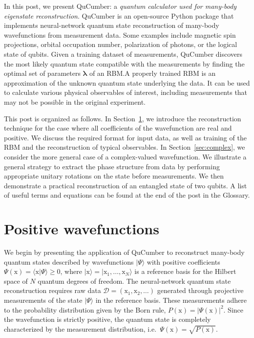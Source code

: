 \documentclass[submission, Phys, hidelnks]{SciPost}
\newcommand{\x}{\bm{\mathrm{x}}}
\begin{document}
In this post, we present QuCumber: a \textit{quantum calculator used for
many-body eigenstate reconstruction}. QuCumber is an open-source Python
package that implements neural-network quantum state reconstruction of
many-body wavefunctions from measurement data.
Some examples include magnetic spin projections, orbital occupation number,
polarization of photons, or the logical state of qubits.
Given a training dataset of measurements, QuCumber discovers the most likely
quantum state compatible with the measurements by finding the optimal set of
parameters $\bm{\lambda}$ of an RBM.\@ A properly trained RBM is an
approximation of the unknown quantum state underlying the data.
It can be used to calculate various physical observables of interest, including
measurements that may not be possible in the original experiment.

This post is organized as follows.
In Section~\ref{sec:positive}, we introduce the reconstruction technique for
the case where all coefficients of the wavefunction are real and positive.
We discuss the required format for input data, as well as training of the RBM
and the reconstruction of typical observables. In Section~\ref{sec:complex},
we consider the more general case of a complex-valued wavefunction.
We illustrate a general strategy to extract the phase structure from data by
performing appropriate unitary rotations on the state before measurements.
We then demonstrate a practical reconstruction of an entangled state of two
qubits. A list of useful terms and equations can be found at the end of the
post in the Glossary.

\section{Positive wavefunctions}\label{sec:positive}
We begin by presenting the application of QuCumber to reconstruct many-body
quantum states described by wavefunctions $|\Psi\rangle$ with positive
coefficients $\Psi(\x)=\langle\x|\Psi\rangle \ge 0$,
where $|\x\rangle=|\mathrm{x}_1,\dots,\mathrm{x}_N\rangle$ is a reference basis
for the Hilbert space of $N$ quantum degrees of freedom.
The neural-network quantum state reconstruction requires raw data
$\mathcal{D}=(\x_1,\x_2,\dots)$ generated through projective measurements of
the state $|\Psi\rangle$ in the reference basis.
These measurements adhere to the probability distribution given by the Born
rule, $P(\x)=|\Psi(\x)|^2$. Since the wavefunction is strictly positive, the
quantum state is completely characterized by the measurement distribution,
i.e.~$\Psi(\x)=\sqrt{P(\x)}$.
\end{document}

